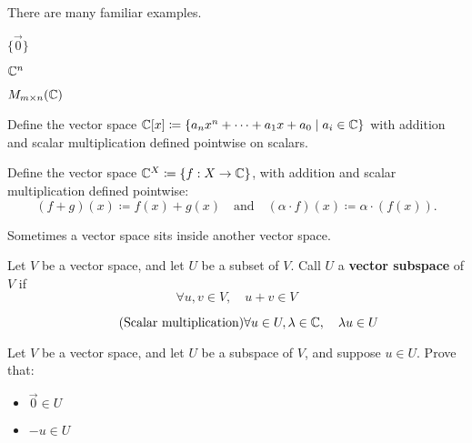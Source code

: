 There are many familiar examples.

\begin{example}[Zero]
    $\{ \vec{0} \}$
\end{example}


\begin{example}[$\C$]
    
\end{example}


\begin{example}[Tuples]
    $\mathbb{C}^n$
\end{example}


\begin{example}[Matrices]
    $M_{m\times n}(\mathbb{C})$
\end{example}


\begin{example}[Polynomials]
    Define the vector space $\mathbb{C}[x] \coloneq \{ a_n x^n +\cdots+ a_1 x + a_0 \mid a_i \in \mathbb{C} \}$ with addition 
    and scalar multiplication defined pointwise on scalars.
\end{example}


\begin{example}[Functions]
    Define the vector space $\mathbb{C}^{X} \coloneq \{ f:X \to \mathbb{C}\}$, with addition and scalar multiplication defined pointwise:
    \[
        (f+g)(x) \coloneq f(x) + g(x) \quad \text{and} \quad (\alpha \cdot f)(x) \coloneq \alpha \cdot (f(x)).
    \]
\end{example}




Sometimes a vector space sits inside another vector space.

\begin{definition}[Subspace]
    Let $V$ be a vector space, and let $U$ be a subset of $V$.
    Call $U$ a {\bf vector subspace} of $V$ if
    \begin{equation*}\tag{Addition}
        \forall u,v\in V, \quad u+v\in V
    \end{equation*}

    \begin{equation*}\tag{Scalar multiplication}
        \forall u\in U, \lambda\in\mathbb{C}, \quad \lambda u\in U
    \end{equation*}
\end{definition}

\begin{exercise}
    Let $V$ be a vector space, and let $U$ be a subspace of $V$, and suppose $u\in U$.
    Prove that:
    \begin{itemize}
        \item $\vec{0} \in U$
        \item $-u\in U$ 
    \end{itemize}
\end{exercise}

